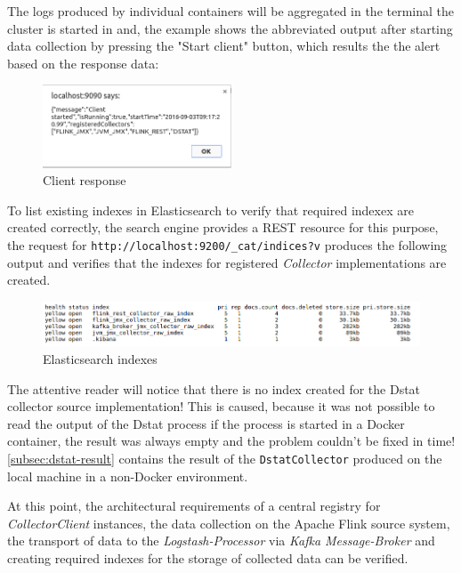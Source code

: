 The logs produced by individual containers will be aggregated in the terminal the cluster is started in and, the example shows the
abbreviated output after starting data collection by pressing the "Start client" button, which results the the alert based on the response data:

\begin{figure}[H]
	\centering
	\includegraphics[width=0.5\textwidth]{../images/11-alert.png}
	\caption{Client response}
	\label{fig:alert}
\end{figure}

To list existing indexes in Elasticsearch to verify that required indexex are created correctly, the search engine provides a
REST resource for this purpose, the request for \verb|http://localhost:9200/_cat/indices?v| produces the following output and verifies
that the indexes for registered \textit{Collector} implementations are created.
\begin{figure}[H]
	\centering
	\includegraphics[width=1.0\textwidth]{../images/12-indexes.png}
	\caption{Elasticsearch indexes}
	\label{fig:indexes}
\end{figure}

The attentive reader will notice that there is no index created for the Dstat collector source implementation! This is caused, because
it was not possible to read the output of the Dstat process if the process is started in a Docker container, the result was always empty
and the problem couldn't be fixed in time! \autoref{subsec:dstat-result} contains the result of the \verb|DstatCollector| produced
on the local machine in a non-Docker environment.


At this point, the architectural requirements of a central registry for \textit{CollectorClient} instances, the data collection on the
Apache Flink source system, the transport of data to the \textit{Logstash-Processor} via \textit{Kafka Message-Broker} and creating required
indexes for the storage of collected data can be verified.

